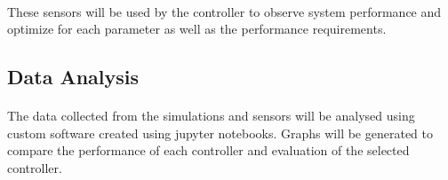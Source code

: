 \paragraph{}These sensors will be used by the controller to observe system performance and optimize for each parameter as well as the performance requirements.
\subsection{Data Analysis}
\paragraph{}The data collected from the simulations and sensors will be analysed using custom software created using jupyter notebooks. Graphs will  be generated to compare the performance of each controller and evaluation of the selected controller.